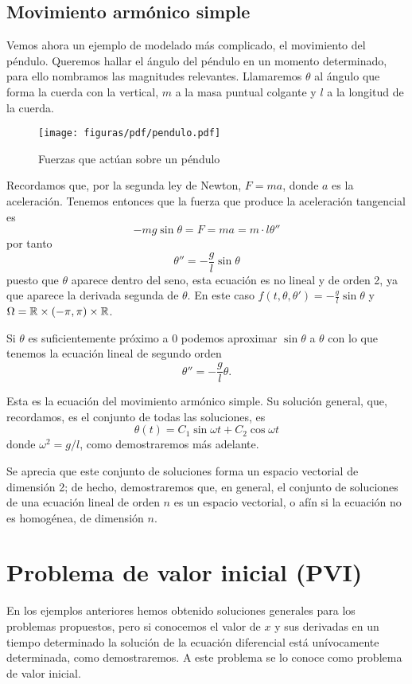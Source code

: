 \documentclass[../ecuaciones_diferenciales.tex]{subfiles}
\begin{document}
\subsection{Movimiento armónico simple} 

Vemos ahora un ejemplo de modelado más complicado, el movimiento del péndulo.
Queremos hallar el ángulo del péndulo en un momento determinado, para ello
nombramos las magnitudes relevantes. Llamaremos \(\theta\) al ángulo que forma
la cuerda con la vertical, \(m\) a la masa puntual colgante y \(l\) a la
longitud de la cuerda.

\begin{figure}[ht]
	\centering
	\texttt{[image: figuras/pdf/pendulo.pdf]}
	\caption{Fuerzas que actúan sobre un péndulo}
	\label{fig:pendulo}
\end{figure}

Recordamos que, por la segunda ley de Newton, \(F = ma\), donde \(a\) es la
aceleración. Tenemos entonces que la fuerza que produce la aceleración
tangencial es
\[-m g \sin\theta = F = ma = m \cdot l \theta''\]
por tanto
\[\theta'' = -\frac{g}{l} \sin\theta\]
puesto que \(\theta\) aparece dentro del seno, esta ecuación es no lineal y de
orden 2, ya que aparece la derivada segunda de \(\theta\). En este caso
\(f(t, \theta, \theta') = -\frac{g}{l} \sin\theta\) y \(\Omega = \mathbb{R} \times
(-\pi, \pi) \times \mathbb{R}\). 

Si \(\theta\) es suficientemente próximo a \(0\) podemos aproximar 
\(\sin\theta\) a \(\theta\) con lo que tenemos la ecuación
lineal de segundo orden
\[\theta'' = -\frac{g}{l}\theta.\]

Esta es la ecuación del movimiento armónico simple. Su solución general, que,
recordamos, es el conjunto de todas las soluciones, es
\[\theta(t) = C_1 \sin \omega t + C_2 \cos \omega t\]
donde \(\omega^2 = g/l\), como demostraremos más adelante.

Se aprecia que este conjunto de soluciones forma un espacio vectorial de
dimensión 2; de hecho, demostraremos que, en general, el conjunto de soluciones
de una ecuación lineal de orden \(n\) es un espacio vectorial, o afín si la
ecuación no es homogénea, de dimensión \(n\).

\section{Problema de valor inicial (PVI)}

En los ejemplos anteriores hemos obtenido soluciones generales para los
problemas propuestos, pero si conocemos el valor de \(x\) y sus derivadas en un
tiempo determinado la solución de la ecuación diferencial está
unívocamente determinada, como demostraremos. A este problema se lo conoce como
problema de valor inicial.
\end{document}
